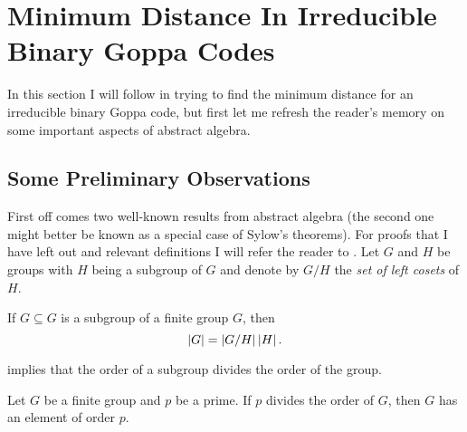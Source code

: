 \section{Minimum Distance In Irreducible Binary Goppa Codes}
\label{sec:minDistIrrBinGoppa}

In this section  I will follow \cite{EOS} in trying to find the minimum distance for an irreducible binary Goppa code, but first let me refresh the reader's memory on some important aspects of abstract algebra.



\subsection{Some Preliminary Observations}
\label{subsec:preAlgebra}

First off comes two well-known results from abstract algebra (the second one might better be known as a special case of Sylow's theorems). For proofs that I have left out and relevant definitions I will refer the reader to \cite{lauritzen}. Let $G$ and $H$ be groups with $H$ being a subgroup of $G$ and denote by $G/H$ the \emph{set of left cosets} of $H$.
\begin{thm}[Lagrange]
\label{thm:LagrangesTheorem}
	If $G \subseteq G$ is a subgroup of a finite group $G$, then
	\[
		\left\vert G \right\vert = \left\vert G/H \right\vert \left\vert H \right\vert.
	\]
\end{thm}
 implies that the order of a subgroup divides the order of the group.
\begin{thm}[Cauchy]
\label{thm:CauchysTheorem}
	Let $G$ be a finite group and $p$ be a prime. If $p$ divides the order of $G$, then $G$ has an element of order $p$.
\end{thm}


